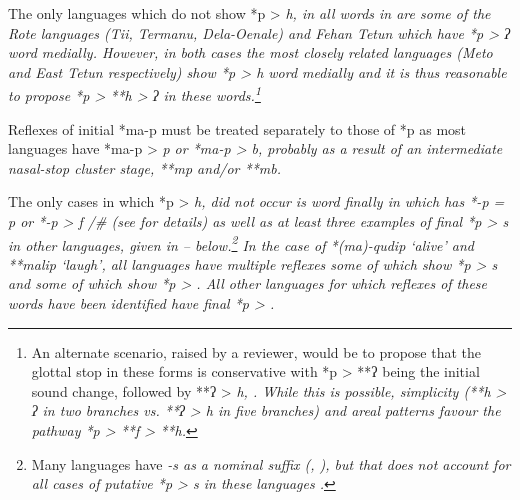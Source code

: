 The only languages which do not show *p > \it{h},
{\0} in all words in  are some of the Rote languages
(Tii, Termanu, Dela-Oenale) and Fehan Tetun which have *p > \it{ʔ} word medially.
However, in both cases the most closely related languages (Meto
and East Tetun respectively) show *p > \it{h} word medially
and it is thus reasonable to propose *p > **h > ʔ in these words.\footnote{
		An alternate scenario, raised by a reviewer,
		would be to propose that the glottal stop in these forms is conservative
		with *p > **ʔ being the initial sound change,
		followed by **ʔ > \it{h}, {\0}.
		While this is possible,
		simplicity (**h > \it{ʔ} in two branches vs.
		**ʔ > \it{h} in five branches)
		and areal patterns favour the pathway *p > **f > **h.}

Reflexes of initial *ma-p must be treated separately to those
of *p as most  languages have *ma-p > \it{p}
or *ma-p > \it{b},
probably as a result of an intermediate nasal-stop cluster stage, **mp and/or **mb.

The only cases in which *p > \it{h,} {\0} did not occur is word
finally in  which has *-p = \it{p} or
*-p > \it{f} /{\gap}{\#} (see  for details) as well
as at least three examples of final *p > \it{s} in other 
languages, given in -- below.\footnote{
		Many  languages have
		\it{-s} as a nominal suffix (\citealp[442f, 445f]{Edwards2020}, \citealp[167--176]{Tamelan2021}), but that does
		not account for all cases of putative *p > \it{s} in these languages
		\citep[74]{Edwards2021}.}
In the case of *(ma)-qudip ‘alive’
and **malip ‘laugh’, all languages have multiple reflexes some
of which show *p > \it{s}
and some of which show *p > {\0}.
All other  languages for which reflexes of these
words have been identified have final *p > {\0}.

